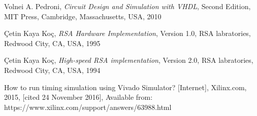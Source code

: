
\begin{thebibliography}{9}
  Volnei A. Pedroni,
  \emph{Circuit Design and Simulation with VHDL},
  Second Edition,
  MIT Press,
  Cambridge,
  Massachusetts,
  USA,
  2010

  \c{C}etin Kaya Ko\c{c},
  \emph{RSA Hardware Implementation},
  Version 1.0,
  RSA labratories,
  Redwood City, CA,
  USA,
  1995

  \c{C}etin Kaya Ko\c{c},
  \emph{High-speed RSA implementation},
  Version 2.0,
  RSA labratories,
  Redwood City, CA,
  USA,
  1994
  
 How to run timing simulation using Vivado Simulator? [Internet],
 Xilinx.com,
 2015,
 [cited 24 November 2016],
 Available from: https://www.xilinx.com/support/answers/63988.html

\end{thebibliography}

